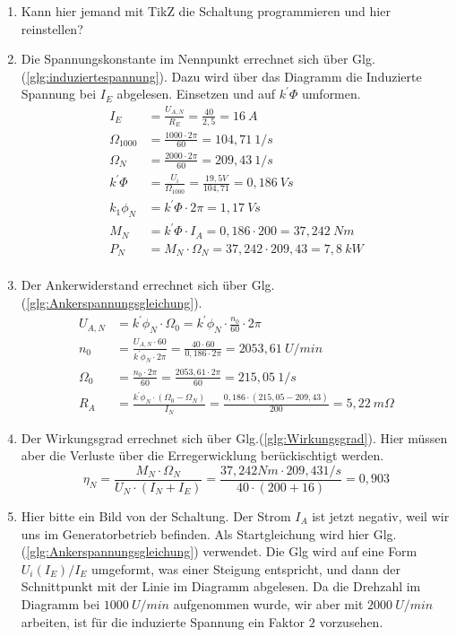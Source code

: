 \begin{solution}
\begin{enumerate}
\item Kann hier jemand mit TikZ die Schaltung programmieren und hier reinstellen?
\item Die Spannungskonstante im Nennpunkt errechnet sich über Glg.(\ref{glg:induziertespannung}). Dazu wird über das Diagramm die Induzierte Spannung bei $I_E$ abgelesen. Einsetzen und auf $k^{'}\Phi$ umformen.
\begin{align}
I_E &= \frac{U_{A,N}}{R_E}=\frac{40}{2,5} = 16~A\\
\Omega_{1000}&= \frac{1000 \cdot 2 \pi}{60} = 104,71~ 1/s\\
\Omega_N&= \frac{2000 \cdot 2 \pi}{60} = 209,43~ 1/s\\
k^{'}\Phi &= \frac{U_i}{\Omega_{1000}} = \frac{19,5V}{104,71}=0,186 ~Vs\\
k_1 \phi_N &= k^{'}\Phi \cdot 2 \pi = 1,17~Vs\\
M_N&=k^{'}\Phi \cdot I_A =0,186 \cdot 200 = 37,242 ~Nm \\
P_N &= M_N \cdot \Omega_N = 37,242 \cdot 209,43 = 7,8 ~kW\\
\end{align}
\item Der Ankerwiderstand errechnet sich über Glg.(\ref{glg:Ankerspannungsgleichung}).
\begin{align}
U_{A,N} & = k^{'}\phi_N \cdot \Omega_0 = k^{'}\phi_N \cdot \frac{n_0}{60} \cdot 2 \pi \\
n_0 & = \frac{U_{A,N} \cdot 60}{k^{'}\phi_N \cdot 2 \pi} = \frac{40 \cdot 60}{0,186 \cdot 2 \pi} = 2053,61 ~U/min\\
\Omega_0 &= \frac{n_0 \cdot 2 \pi}{60} = \frac{2053,61 \cdot 2 \pi}{60}=215,05~1/s\\
R_A &= \frac{k^{'}\phi_N \cdot (\Omega_0 -\Omega_N)}{I_N} =\frac{0,186 \cdot (215,05 -209,43)}{200} = 5,22~m\Omega
\end{align}
\item Der Wirkungsgrad errechnet sich über Glg.(\ref{glg:Wirkungsgrad}). Hier müssen aber die Verluste über die Erregerwicklung berückischtigt werden.
\begin{equation}
\eta_N = \frac{M_N \cdot \Omega_N}{U_N \cdot (I_N+ I_E)} = \frac{37,242 Nm \cdot 209,43 1/s}{40 \cdot (200 + 16)}=0,903
\end{equation}
\item Hier bitte ein Bild von der Schaltung. Der Strom $I_A$ ist jetzt negativ, weil wir uns im Generatorbetrieb befinden. Als Startgleichung wird hier Glg.(\ref{glg:Ankerspannungsgleichung}) verwendet. Die Glg wird auf eine Form $U_i(I_E)/I_E$ umgeformt, was einer Steigung entspricht, und dann der Schnittpunkt mit der Linie im Diagramm abgelesen. Da die Drehzahl im Diagramm bei $1000 ~U/min$ aufgenommen wurde, wir aber mit $2000~U/min$ arbeiten, ist für die induzierte Spannung ein Faktor $2$ vorzusehen.

\end{enumerate}
\end{solution}
